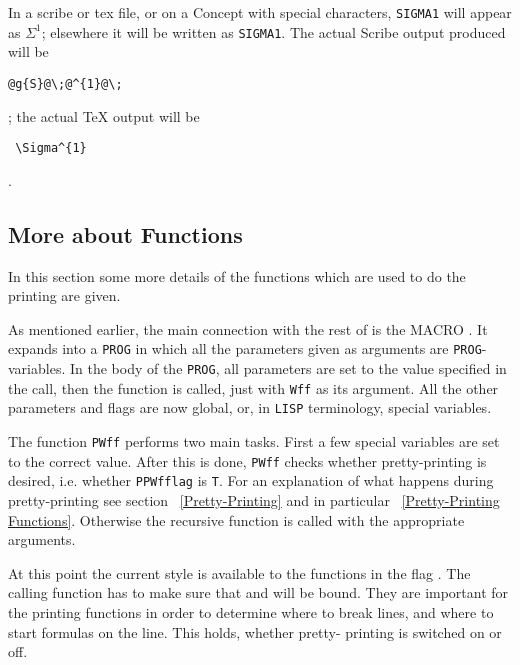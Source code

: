 In a scribe or tex file, or on a Concept with special characters, {\tt SIGMA1} will
appear as $\Sigma^1$; elsewhere it will be written as {\tt SIGMA1}. The actual Scribe
output produced will be \begin{verbatim}@g{S}@\;@^{1}@\;\end{verbatim}; the actual \TeX
output will be \begin{verbatim} \Sigma^{1} \end{verbatim}.

\subsection{More about Functions}\label{More Printing Functions}

In this section some more details of the functions which are used to
do the printing are given. 

As mentioned earlier, the main connection with the rest of \TPS is
the MACRO .  It expands into a {\tt PROG} in which
all the parameters given as arguments are {\tt PROG}-variables.  In the body
of the {\tt PROG}, all parameters are set to the value specified in the call,
then the function  is called, just with {\tt Wff} as its
argument.  All the other parameters and flags are now global, or, in {\tt LISP}
terminology, special variables.

The function {\tt PWff} performs two main tasks. First a few special variables
are set to the correct value.   After this is done, {\tt PWff} checks whether
pretty-printing is desired, i.e. whether {\tt PPWfflag} is {\tt T}.
For an explanation of what happens during pretty-printing see section 
~\ref{Pretty-Printing} and in particular ~\ref{Pretty-Printing Functions}.
Otherwise the recursive function  is called
with the appropriate arguments.

At this point the current style is available to the functions in the
flag . The calling function has to make sure
that  and
 will be bound.  They are important
for the printing functions in order to determine where to break lines,
and where to start formulas on the line.  This holds, whether pretty-
printing is switched on or off.

